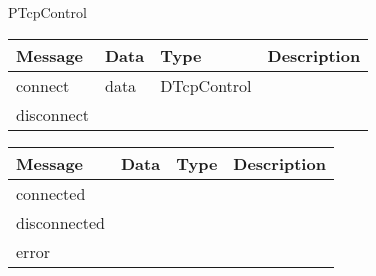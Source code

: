  {PTcpControl}

\begin{tabular}[ht]{|l|l|l|p{8cm}|}
\hline
Message & Data & Type & Description\\
\hline
connect &  data  &  DTcpControl  & \\
\hline
disconnect &  &  & \\
\hline
\end{tabular}
\begin{tabular}[ht]{|l|l|l|p{8cm}|}
\hline
Message & Data & Type & Description\\
\hline
connected &  &  & \\
\hline
disconnected &  &  & \\
\hline
error &  &  & \\
\hline
\end{tabular}
